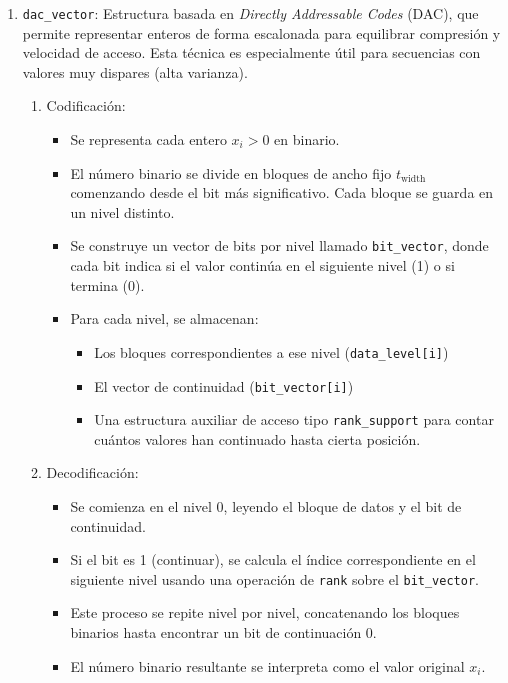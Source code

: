 \begin{enumerate}
\begin{enumerate}
            \item \texttt{dac\_vector}:
            Estructura basada en \textit{Directly Addressable Codes} (DAC), que permite representar enteros de forma escalonada para equilibrar compresión y velocidad de acceso. Esta técnica es especialmente útil para secuencias con valores muy dispares (alta varianza).
            \begin{enumerate}
                \item Codificación:
                \begin{itemize}
                    \item Se representa cada entero \( x_i > 0 \) en binario.
                    \item El número binario se divide en bloques de ancho fijo \( t_{\text{width}} \) comenzando desde el bit más significativo. Cada bloque se guarda en un nivel distinto.
                    \item Se construye un vector de bits por nivel llamado \texttt{bit\_vector}, donde cada bit indica si el valor continúa en el siguiente nivel (1) o si termina (0).
                    \item Para cada nivel, se almacenan:
                    \begin{itemize}
                        \item Los bloques correspondientes a ese nivel (\texttt{data\_level[i]})
                        \item El vector de continuidad (\texttt{bit\_vector[i]})
                        \item Una estructura auxiliar de acceso tipo \texttt{rank\_support} para contar cuántos valores han continuado hasta cierta posición.
                    \end{itemize}
                \end{itemize}

                \item Decodificación:
                \begin{itemize}
                    \item Se comienza en el nivel 0, leyendo el bloque de datos y el bit de continuidad.
                    \item Si el bit es 1 (continuar), se calcula el índice correspondiente en el siguiente nivel usando una operación de \texttt{rank} sobre el \texttt{bit\_vector}.
                    \item Este proceso se repite nivel por nivel, concatenando los bloques binarios hasta encontrar un bit de continuación 0.
                    \item El número binario resultante se interpreta como el valor original \(x_i\).
                \end{itemize}


\end{enumerate}
\end{enumerate}
\end{enumerate}
